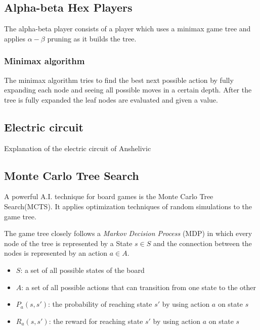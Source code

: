 \documentclass{ba-kecs}
\begin{document}
\subsection{Alpha-beta Hex Players}
The alpha-beta player consists of a player which uses a minimax game tree and applies $\alpha - \beta$ pruning as it builds the tree.
\subsubsection{Minimax algorithm}
The minimax algorithm tries to find the best next possible action by fully expanding each node and seeing all possible moves in a certain depth. After the tree is fully expanded the leaf nodes are evaluated and given a value. 

\subsection{Electric circuit}
Explanation of the electric circuit of Anshelivic

\subsection{Monte Carlo Tree Search}
A powerful A.I. technique for board games is the Monte Carlo Tree Search(MCTS). It applies optimization techniques of random simulations to the game tree. 

The game tree closely follows a \textit{Markov Decision Process} (MDP) in which every node of the tree is represented by a State $s \in S$ and the connection between the nodes is represented by an action $a \in A$.
\begin{itemize}
\item $S$: a set of all possible states of the board
\item $A$: a set of all possible actions that can transition from one state to the other
\item $P_a(s, s')$: the probability of reaching state $s'$ by using action $a$ on state $s$
\item $R_a(s, s')$: the reward for reaching state $s'$ by using action $a$ on state $s$
\end{itemize}
\end{document}
